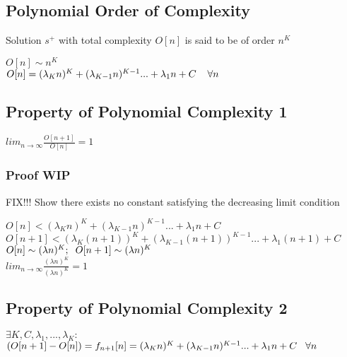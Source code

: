 \documentclass[11pt]{article}
\begin{document}
\subsection{Polynomial Order of Complexity}
Solution $s^+$ with total complexity $O[n]$ is said to be of order $n^K$
\begin{center}
$
 O[n] \sim n^K
$
\\ \vspace{2mm}
$O[n] = (\lambda_{K} n)^{K} + (\lambda_{K-1} n)^{K-1}... + \lambda_1 n +  C \hspace{4mm} \forall n$
\end{center}








\subsection{Property of Polynomial  Complexity 1}
\begin{center}
$
lim_{n \rightarrow \infty} \frac{O[n+1]}{O[n]} = 1
$
\end{center}
\subsubsection{Proof WIP}
FIX!!!
Show there exists no constant satisfying the decreasing limit condition
\begin{center}
$
O[n] < (\lambda_K n)^K + (\lambda_{K-1} n)^{K-1}... + \lambda_1 n + C
$
\\ \vspace{2mm}
$
O[n+1] < (\lambda_K (n+1))^K + (\lambda_{K-1} (n+1))^{K-1}... + \lambda_1 (n+1) + C
$
\\ \vspace{2mm}
$
O[n] \sim (\lambda n)^K; \hspace{2mm} O[n+1] \sim  (\lambda n)^K
$
\\ \vspace{2mm}
$
lim_{n \rightarrow \infty} \frac{(\lambda n)^K}{(\lambda n)^K} = 1
$
\end{center}







\subsection{Property of Polynomial Complexity 2}
\begin{center}
$
\exists K,C,\lambda_1,...,\lambda_K :
$
\\ \vspace{2mm}
$
( O[n+1] - O[n] ) = f_{n+1}[n] = (\lambda_K n)^K + (\lambda_{K-1} n)^{K-1}... + \lambda_1 n + C \hspace{3mm} \forall n
$
\end{center}
\end{document}

